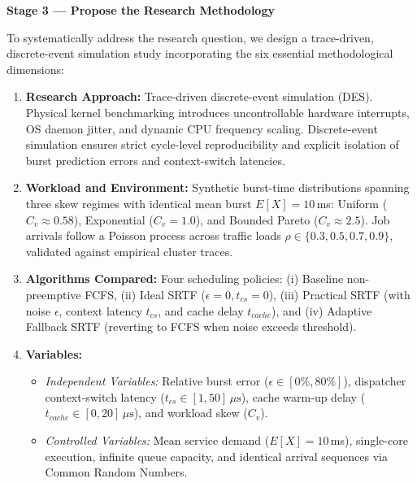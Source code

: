 \documentclass[11pt]{article}
\newcommand{\topicTitle}[1]{
    \vspace{0.35em}\noindent{\fontsize{11}{13.2}\selectfont \textbf{#1}}\par\vspace{0.2em}
}
\begin{document}
\newpage
{\centering\fontsize{13}{16}\selectfont\textbf{Stage 3 --- Propose the Research Methodology}\par}
\vspace{0.3em}

\topicTitle{Task D: Research Design}

To systematically address the research question, we design a trace-driven, discrete-event simulation study incorporating the six essential methodological dimensions:

\begin{enumerate}[label=\textbf{\arabic*.}, leftmargin=1.4em, itemsep=0.3em, parsep=0pt]
    \item \textbf{Research Approach:} Trace-driven discrete-event simulation (DES). Physical kernel benchmarking introduces uncontrollable hardware interrupts, OS daemon jitter, and dynamic CPU frequency scaling. Discrete-event simulation ensures strict cycle-level reproducibility and explicit isolation of burst prediction errors and context-switch latencies.
    \item \textbf{Workload and Environment:} Synthetic burst-time distributions spanning three skew regimes with identical mean burst $E[X] = 10$\,ms: Uniform ($C_v \approx 0.58$), Exponential ($C_v = 1.0$), and Bounded Pareto ($C_v \approx 2.5$). Job arrivals follow a Poisson process across traffic loads $\rho \in \{0.3, 0.5, 0.7, 0.9\}$, validated against empirical cluster traces.
    \item \textbf{Algorithms Compared:} Four scheduling policies: (i) Baseline non-preemptive FCFS, (ii) Ideal SRTF ($\epsilon=0, t_{cs}=0$), (iii) Practical SRTF (with noise $\epsilon$, context latency $t_{cs}$, and cache delay $t_{cache}$), and (iv) Adaptive Fallback SRTF (reverting to FCFS when noise exceeds threshold).
    \item \textbf{Variables:}
    \begin{itemize}[label=$\circ$, leftmargin=1.2em, itemsep=0.15em]
        \item \textit{Independent Variables:} Relative burst error ($\epsilon \in [0\%, 80\%]$), dispatcher context-switch latency ($t_{cs} \in [1, 50]\,\mu\text{s}$), cache warm-up delay ($t_{cache} \in [0, 20]\,\mu\text{s}$), and workload skew ($C_v$).
        \item \textit{Controlled Variables:} Mean service demand ($E[X] = 10$\,ms), single-core execution, infinite queue capacity, and identical arrival sequences via Common Random Numbers.

\end{itemize}
\end{enumerate}
\end{document}

